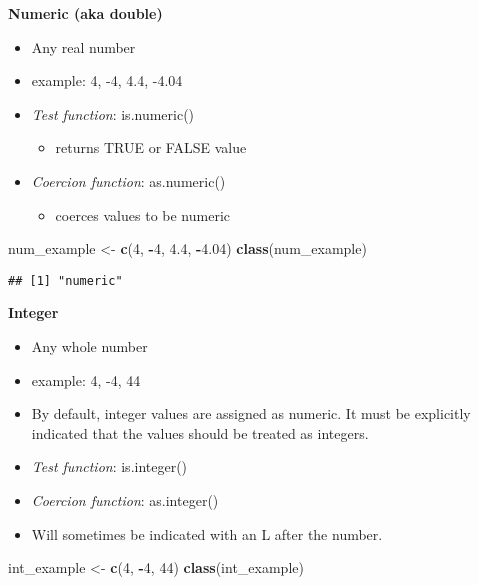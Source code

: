 \documentclass[]{article}
\newenvironment{Shaded}{\begin{snugshade}}{\end{snugshade}}
\newcommand{\KeywordTok}[1]{\textcolor[rgb]{0.13,0.29,0.53}{\textbf{#1}}}
\newcommand{\DecValTok}[1]{\textcolor[rgb]{0.00,0.00,0.81}{#1}}
\newcommand{\FloatTok}[1]{\textcolor[rgb]{0.00,0.00,0.81}{#1}}
\newcommand{\StringTok}[1]{\textcolor[rgb]{0.31,0.60,0.02}{#1}}
\newcommand{\OperatorTok}[1]{\textcolor[rgb]{0.81,0.36,0.00}{\textbf{#1}}}
\newcommand{\NormalTok}[1]{#1}
\providecommand{\tightlist}{%
  \setlength{\itemsep}{0pt}\setlength{\parskip}{0pt}}
\begin{document}
\textbf{Numeric (aka double)}

\begin{itemize}
\tightlist
\item
  Any real number
\item
  example: 4, -4, 4.4, -4.04
\item
  \emph{Test function}: is.numeric()

  \begin{itemize}
  \tightlist
  \item
    returns TRUE or FALSE value
  \end{itemize}
\item
  \emph{Coercion function}: as.numeric()

  \begin{itemize}
  \tightlist
  \item
    coerces values to be numeric
  \end{itemize}
\end{itemize}

\begin{Shaded}
\begin{Highlighting}[]
\NormalTok{num_example <-}\StringTok{ }\KeywordTok{c}\NormalTok{(}\DecValTok{4}\NormalTok{, }\OperatorTok{-}\DecValTok{4}\NormalTok{, }\FloatTok{4.4}\NormalTok{, }\OperatorTok{-}\FloatTok{4.04}\NormalTok{)}
\KeywordTok{class}\NormalTok{(num_example)}
\end{Highlighting}
\end{Shaded}

\begin{verbatim}
## [1] "numeric"
\end{verbatim}

\textbf{Integer}

\begin{itemize}
\tightlist
\item
  Any whole number
\item
  example: 4, -4, 44
\item
  By default, integer values are assigned as numeric. It must be
  explicitly indicated that the values should be treated as integers.
\item
  \emph{Test function}: is.integer()
\item
  \emph{Coercion function}: as.integer()
\item
  Will sometimes be indicated with an L after the number.
\end{itemize}

\begin{Shaded}
\begin{Highlighting}[]
\NormalTok{int_example <-}\StringTok{ }\KeywordTok{c}\NormalTok{(}\DecValTok{4}\NormalTok{, }\OperatorTok{-}\DecValTok{4}\NormalTok{, }\DecValTok{44}\NormalTok{)}
\KeywordTok{class}\NormalTok{(int_example)}
\end{Highlighting}
\end{Shaded}
\end{document}
